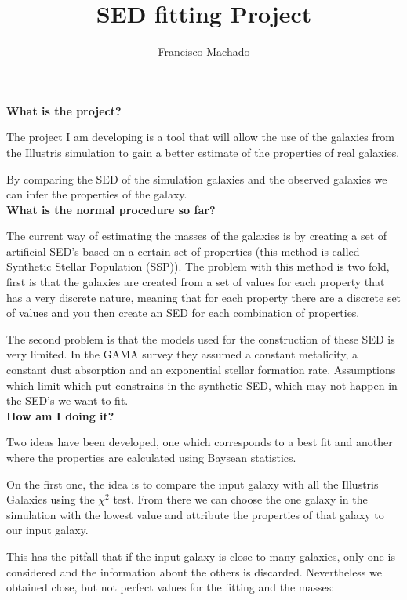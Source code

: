 \documentclass[11pt]{report}
\author{Francisco Machado}
\title{SED fitting Project}
\begin{document}
\maketitle

{\bf What is the project?}

The project I am developing is a tool that will allow the use of the galaxies from the Illustris simulation to gain a better estimate of the properties of real galaxies.

By comparing the SED of the simulation galaxies and the observed galaxies we can infer the properties of the galaxy.\\

{\bf What is the normal procedure so far?}

The current way of estimating the masses of the galaxies is by creating a set of artificial SED's based on a certain set of properties (this method is called Synthetic Stellar Population (SSP)). The problem with this method is two fold, first is that the galaxies are created from a set of values for each property that has a very discrete nature, meaning that for each property there are a discrete set of values and you then create an SED for each combination of properties.

The second problem is that the models used for the construction of these SED is very limited. In the GAMA survey they assumed a constant metalicity, a constant dust absorption and an exponential stellar formation rate. Assumptions which limit which put constrains in the synthetic SED, which may not happen in the SED's we want to fit.\\

{\bf How am I doing it?}

Two ideas have been developed, one which corresponds to a best fit and another where the properties are calculated using Baysean statistics.

On the first one, the idea is to compare the input galaxy with all the Illustris Galaxies using the $\chi^2$ test. From there we can choose the one galaxy in the simulation with the lowest value and attribute the properties of that galaxy to our input galaxy.

This has the pitfall that if the input galaxy is close to many galaxies, only one is considered and the information about the others is discarded. Nevertheless we obtained close, but not perfect values for the fitting and the masses:
\end{document}
